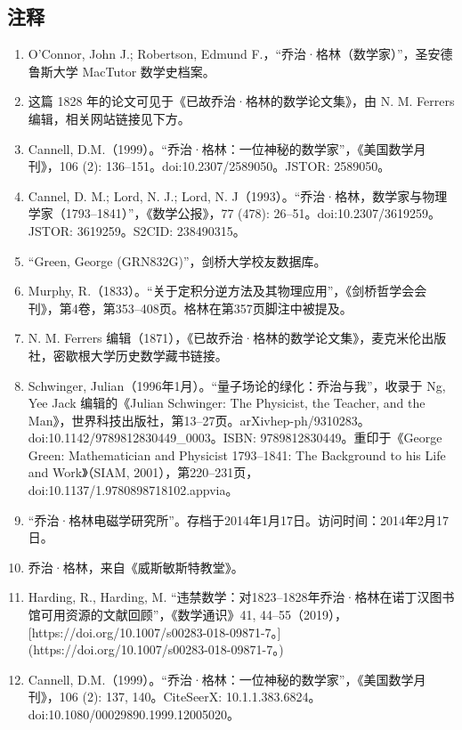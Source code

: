 \subsection{注释}
\begin{enumerate}
\item O'Connor, John J.; Robertson, Edmund F.，“乔治·格林（数学家）”，圣安德鲁斯大学 MacTutor 数学史档案。
\item 这篇 1828 年的论文可见于《已故乔治·格林的数学论文集》，由 N. M. Ferrers 编辑，相关网站链接见下方。
\item Cannell, D.M.（1999）。“乔治·格林：一位神秘的数学家”，《美国数学月刊》，106 (2): 136–151。doi:10.2307/2589050。JSTOR: 2589050。
\item Cannel, D. M.; Lord, N. J.; Lord, N. J（1993）。“乔治·格林，数学家与物理学家（1793–1841）”，《数学公报》，77 (478): 26–51。doi:10.2307/3619259。JSTOR: 3619259。S2CID: 238490315。
\item “Green, George (GRN832G)”，剑桥大学校友数据库。
\item Murphy, R.（1833）。“关于定积分逆方法及其物理应用”，《剑桥哲学会会刊》，第4卷，第353–408页。格林在第357页脚注中被提及。
\item N. M. Ferrers 编辑（1871），《已故乔治·格林的数学论文集》，麦克米伦出版社，密歇根大学历史数学藏书链接。
\item  Schwinger, Julian（1996年1月）。“量子场论的绿化：乔治与我”，收录于 Ng, Yee Jack 编辑的《Julian Schwinger: The Physicist, the Teacher, and the Man》，世界科技出版社，第13–27页。arXiv\:hep-ph/9310283。doi:10.1142/9789812830449\_0003。ISBN: 9789812830449。重印于《George Green: Mathematician and Physicist 1793–1841: The Background to his Life and Work》（SIAM, 2001），第220–231页，doi:10.1137/1.9780898718102.appvia。
\item “乔治·格林电磁学研究所”。存档于2014年1月17日。访问时间：2014年2月17日。
\item  乔治·格林，来自《威斯敏斯特教堂》。
\item Harding, R., Harding, M. “违禁数学：对1823–1828年乔治·格林在诺丁汉图书馆可用资源的文献回顾”，《数学通识》41, 44–55（2019），[https://doi.org/10.1007/s00283-018-09871-7。](https://doi.org/10.1007/s00283-018-09871-7。)
\item Cannell, D.M.（1999）。“乔治·格林：一位神秘的数学家”，《美国数学月刊》，106 (2): 137, 140。CiteSeerX: 10.1.1.383.6824。doi:10.1080/00029890.1999.12005020。
\end{enumerate}
